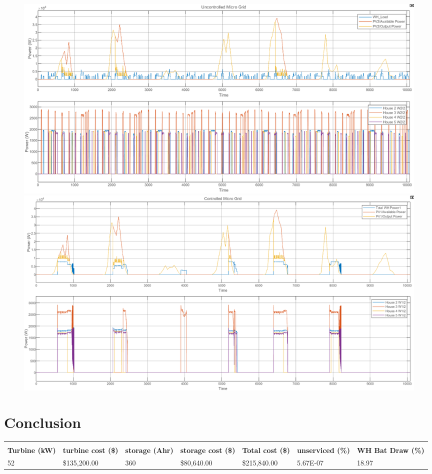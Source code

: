 \documentclass[11pt]{article}
\begin{document}
\begin{figure}[h!]
    \centering
    \includegraphics[width=\textwidth]{inc/uncontrolled_load_.png}   
    \includegraphics[width=\textwidth]{inc/controlled_load_.png}    
    \caption{}
    \label{fig:power_distributed}
\end{figure}



\newpage
\section{Conclusion}

\begin{table}[h!]
    \begin{adjustbox}{width=\textwidth}
        \begin{tabular}{lllllll}
            \multicolumn{7}{c}{\cellcolor[HTML]{C6EFCE}{\color[HTML]{006100} Controlled}}                                                                                                              \\
            \textbf{Turbine (kW)} & \textbf{turbine cost (\$)} & \textbf{storage (Ahr)} & \textbf{storage cost (\$)} & \textbf{Total cost (\$)} & \textbf{unserviced (\%)} & \textbf{WH Bat Draw (\%)} \\
            52                    & \$135,200.00               & 360                    & \$80,640.00                & \$215,840.00             & 5.67E-07                 & 18.97                    
        \end{tabular}
    \end{adjustbox}
\end{table}
\end{document}
